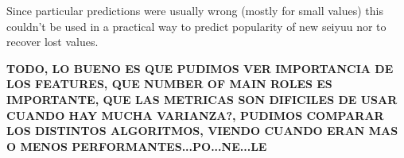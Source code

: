 
Since particular predictions were usually wrong (mostly for small values) this couldn't be used in a practical way to predict popularity of new seiyuu nor to recover lost values. 

\textbf{TODO, LO BUENO ES QUE PUDIMOS VER IMPORTANCIA DE LOS FEATURES, QUE NUMBER OF MAIN ROLES ES IMPORTANTE, QUE LAS METRICAS SON DIFICILES DE USAR CUANDO HAY MUCHA VARIANZA?, PUDIMOS COMPARAR LOS DISTINTOS ALGORITMOS, VIENDO CUANDO ERAN MAS O MENOS PERFORMANTES...PO...NE...LE}